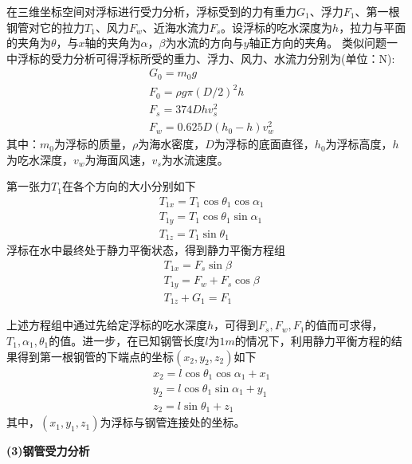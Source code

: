 \documentclass[UTF8]{ctexbook}
\theoremstyle{nonumberplain}
\begin{document}
            \par
            在三维坐标空间对浮标进行受力分析，浮标受到的力有重力$G_1$、浮力$F_1$、第一根钢管对它的拉力$T_1$、风力$F_w$、近海水流力$F_s$。设浮标的吃水深度为$h$，拉力与平面的夹角为$\theta$，与$x$轴的夹角为$\alpha$，$\beta$为水流的方向与$y$轴正方向的夹角。
            类似问题一中浮标的受力分析可得浮标所受的重力、浮力、风力、水流力分别为(单位：N):
            \begin{align*}
            & G_0 = m_0g\\
            & F_0 = \rho g\pi ( D/2 )^2h\\
            & F_s = 374Dhv_s^2\\
            & F_w = 0.625D(h_0-h)v_w^2
            \end{align*}
            其中：$m_0$为浮标的质量，$\rho$为海水密度，$D$为浮标的底面直径，$h_0$为浮标高度，$h$为吃水深度，$v_w$为海面风速，$v_s$为水流速度。
            \par
            第一张力$T_1$在各个方向的大小分别如下
            \begin{align*}
            & T_{1x} = T_1\cos\theta_1\cos\alpha_1\\
            & T_{1y} = T_1\cos\theta_1\sin\alpha_1\\
            & T_{1z} = T_1\sin \theta_1
            \end{align*}
            浮标在水中最终处于静力平衡状态，得到静力平衡方程组
            \begin{align*}
            & T_{1x} = F_s\sin \beta\\
            & T_{1y} = F_w + F_s\cos\beta\\
            & T_{1z} + G_1 = F_1
            \end{align*}
            \par
            上述方程组中通过先给定浮标的吃水深度$h$，可得到$F_s,F_w,F_1$的值而可求得，$T_1,\alpha_1,\theta_1$的值。进一步，在已知钢管长度$l$为$1m$的情况下，利用静力平衡方程的结果得到第一根钢管的下端点的坐标$(x_2,y_2,z_2)$如下
            \begin{align*}
            & x_2 = l\cos\theta_1\cos\alpha_1+x_1\\
            & y_2 = l\cos\theta_1\sin\alpha_1+y_1\\
            & z_2 = l\sin\theta_1+z_1
            \end{align*}
            其中，$(x_1,y_1,z_1)$为浮标与钢管连接处的坐标。
            \par
            \textbf{(3)钢管受力分析}
            \par
\end{document}
